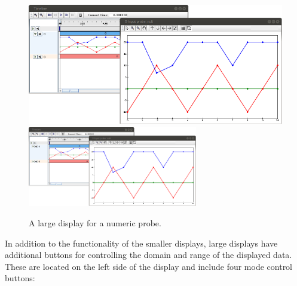 \documentclass{article}
\begin{document}
\begin{figure}
\begin{center}
\iflatexml
\includegraphics[]{images/largeDisplay}
\else
\includegraphics[width=0.66\textwidth]{images/largeDisplay}
\fi
\end{center}
\caption{A large display for a numeric probe.}%
\label{largeDisplayFig}
\end{figure}

In addition to the functionality of the smaller displays, large
displays have additional buttons for controlling the domain
and range of the displayed data. These are located on the left side
of the display and include four mode control buttons:
\end{document}
